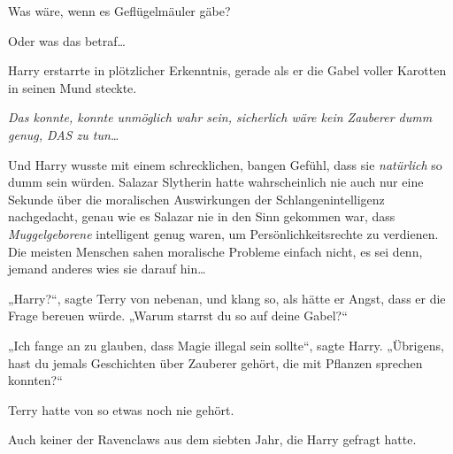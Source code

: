 Was wäre, wenn es Geflügelmäuler gäbe?

Oder was das betraf…

Harry erstarrte in plötzlicher Erkenntnis, gerade als er die Gabel voller Karotten in seinen Mund steckte.

\emph{Das konnte, konnte unmöglich wahr sein, sicherlich wäre kein Zauberer dumm genug, DAS zu tun…}

Und Harry wusste mit einem schrecklichen, bangen Gefühl, dass sie \emph{natürlich} so dumm sein würden. Salazar Slytherin hatte wahrscheinlich nie auch nur eine Sekunde über die moralischen Auswirkungen der Schlangenintelligenz nachgedacht, genau wie es Salazar nie in den Sinn gekommen war, dass \emph{Muggelgeborene} intelligent genug waren, um Persönlichkeitsrechte zu verdienen. Die meisten Menschen sahen moralische Probleme einfach nicht, es sei denn, jemand anderes wies sie darauf hin…

„Harry?“, sagte Terry von nebenan, und klang so, als hätte er Angst, dass er die Frage bereuen würde.
„Warum starrst du so auf deine Gabel?“

„Ich fange an zu glauben, dass Magie illegal sein sollte“, sagte Harry. „Übrigens, hast du jemals Geschichten über Zauberer gehört, die mit Pflanzen sprechen konnten?“

\later

Terry hatte von so etwas noch nie gehört.

Auch keiner der Ravenclaws aus dem siebten Jahr, die Harry gefragt hatte.

